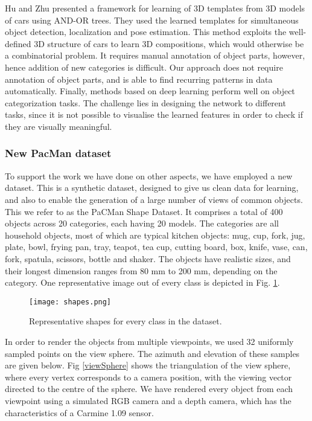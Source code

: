 \documentclass[a4paper,11pt,pdf]{../templates/pacmanreport}
\begin{document}
Hu and Zhu \cite{hu2015learning} presented a framework for learning of 3D templates from 3D models of cars using AND-OR trees. They used the learned templates for simultaneous object detection, localization and pose estimation. This method exploits the well-defined 3D structure of cars to learn 3D compositions, which would otherwise be a combinatorial problem. It requires manual annotation of object parts, however, hence addition of new categories is difficult. Our approach does not require annotation of object parts, and is able to find recurring patterns in data automatically. Finally, methods based on deep learning \cite{wu20153d,Su_2015_ICCV} perform well on object categorization tasks. The challenge lies in designing the network to different tasks, since it is not possible to visualise the learned features in order to check if they are visually meaningful. 

\subsubsection{New PacMan dataset}

To support the work we have done on other aspects, we have employed a new dataset. This is a synthetic dataset, designed to give us clean data for learning, and also to enable the generation of a large number of views of common objects. This we refer to as the PaCMan Shape Dataset. It comprises a total of 400 objects across 20 categories, each having 20 models. The categories are all household objects, most of which are typical kitchen objects: mug, cup, fork, jug, plate, bowl, frying pan, tray, teapot, tea cup, cutting board, box, knife, vase, can, fork, spatula, scissors, bottle and shaker. The objects have realistic sizes, and their longest dimension ranges from 80 mm to 200 mm, depending on the category. One representative image out of every class is depicted in Fig. \ref{shapes}.

 \begin{figure}[!h]
  \caption{Representative shapes for every class in the dataset.}
  \centering
    \texttt{[image: shapes.png]}
\label{shapes}
\end{figure}

In order to render the objects from multiple viewpoints, we used 32 uniformly sampled points on the view sphere. The azimuth and elevation of these samples are given below. Fig \ref{viewSphere} shows the triangulation of the view sphere, where every vertex corresponds to a camera position, with the viewing vector directed to the centre of the sphere. We have  rendered every object from each viewpoint using a simulated RGB camera and a depth camera, which has the characteristics of a Carmine 1.09 sensor.
 
\end{document}

